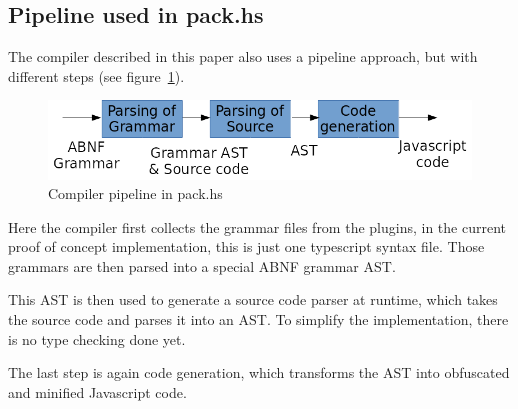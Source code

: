 \subsection{Pipeline used in pack.hs}

The compiler described in this paper also uses a pipeline approach, but with different steps (see figure~\ref{fig:pack.hs_pipeline}).

\begin{figure}[H]
\includegraphics[width=\columnwidth]{./pack_hs_pipeline.png}
\caption{Compiler pipeline in pack.hs}%
\label{fig:pack.hs_pipeline}
\end{figure}

Here the compiler first collects the grammar files from the plugins, in the current proof of concept implementation, this is just one typescript syntax file. Those grammars are then parsed into a special ABNF grammar AST\@.

This AST is then used to generate a source code parser at runtime, which takes the source code and parses it into an AST\@. To simplify the implementation, there is no type checking done yet.

The last step is again code generation, which transforms the AST into obfuscated and minified Javascript code.
